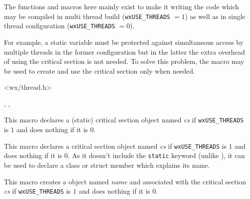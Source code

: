 The functions and macros here mainly exist to make it writing the code which
may be compiled in multi thread build ({\tt wxUSE\_THREADS} $= 1$) as well as
in single thread configuration ({\tt wxUSE\_THREADS} $= 0$).

For example, a static variable must be protected against simultaneous access by
multiple threads in the former configuration but in the latter the extra
overhead of using the critical section is not needed. To solve this problem,
the  macro may be used
to create and use the critical section only when needed.


<wx/thread.h>


, , 



\label{wxcritsectdeclare}


This macro declares a (static) critical section object named {\it cs} if
{\tt wxUSE\_THREADS} is $1$ and does nothing if it is $0$.



\label{wxcritsectdeclaremember}


This macro declares a critical section object named {\it cs} if
{\tt wxUSE\_THREADS} is $1$ and does nothing if it is $0$. As it doesn't
include the {\tt static} keyword (unlike
), it can be used to declare
a class or struct member which explains its name.



\label{wxcritsectlocker}


This macro creates a 
object named {\it name} and associated with the critical section {\it cs} if
{\tt wxUSE\_THREADS} is $1$ and does nothing if it is $0$.



\label{wxcriticalsectionmacro}


